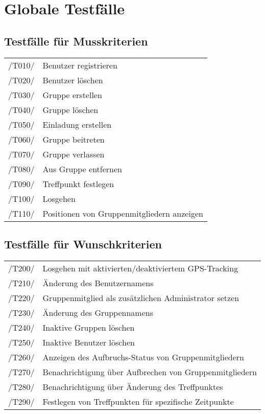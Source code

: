 \section{Globale Testfälle}
\subsection{Testfälle für Musskriterien}
\begin{tabular}{ll}
/T010/ & Benutzer registrieren \\
/T020/ & Benutzer löschen \\
/T030/ & Gruppe erstellen \\
/T040/ & Gruppe löschen \\
/T050/ & Einladung erstellen \\
/T060/ & Gruppe beitreten \\
/T070/ & Gruppe verlassen \\
/T080/ & Aus Gruppe entfernen \\
/T090/ & Treffpunkt festlegen \\
/T100/ & Losgehen \\ %
/T110/ & Positionen von Gruppenmitgliedern anzeigen \\
\end{tabular}

\subsection{Testfälle für Wunschkriterien}
\begin{tabular}{ll}
/T200/ & Losgehen mit aktivierten/deaktiviertem GPS-Tracking \\ %
/T210/ & Änderung des Benutzernamens \\
/T220/ & Gruppenmitglied als zusätzlichen Administrator setzen \\
/T230/ & Änderung des Gruppennamens \\
/T240/ & Inaktive Gruppen löschen \\
/T250/ & Inaktive Benutzer löschen \\
/T260/ & Anzeigen des Aufbruchs-Status von Gruppenmitgliedern \\
/T270/ & Benachrichtigung über Aufbrechen von Gruppenmitgliedern \\
/T280/ & Benachrichtigung über Änderung des Treffpunktes \\
/T290/ & Festlegen von Treffpunkten für spezifische Zeitpunkte \\
\end{tabular}
